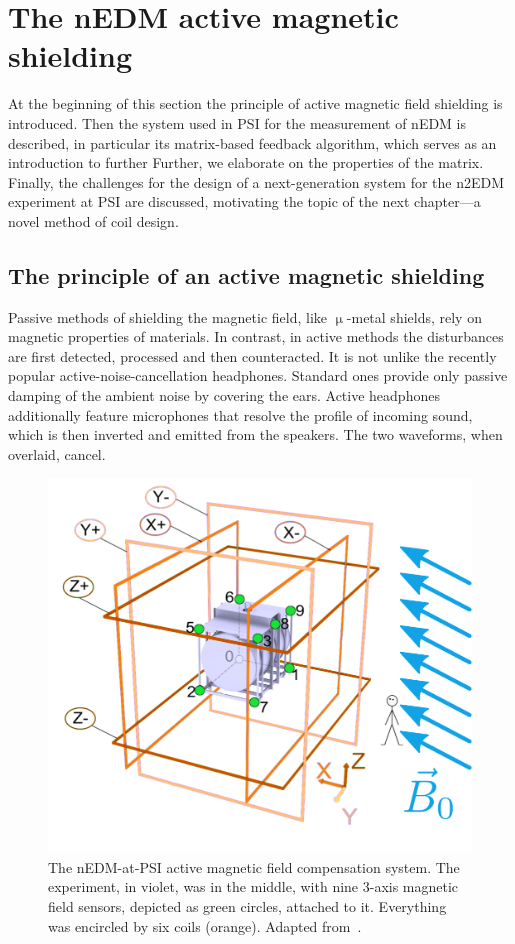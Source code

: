 \chapter{The nEDM active magnetic shielding}

\label{ch:nedm_sfc}

At the beginning of this section the principle of active magnetic field shielding is introduced. Then the system used in PSI for the measurement of nEDM is described, in particular its matrix-based feedback algorithm, which serves as an introduction to further Further, we elaborate on the properties of the matrix. Finally, the challenges for the design of a next-generation system for the n2EDM experiment at PSI are discussed, motivating the topic of the next chapter---a novel method of coil design.


\section{The principle of an active magnetic shielding}
Passive methods of shielding the magnetic field, like $\upmu$-metal shields, rely on magnetic properties of materials. In contrast, in active methods the disturbances are first detected, processed and then counteracted. It is not unlike the recently popular active-noise-cancellation headphones. Standard ones provide only passive damping of the ambient noise by covering the ears. Active headphones additionally feature microphones that resolve the profile of incoming sound, which is then inverted and emitted from the speakers. The two waveforms, when overlaid, cancel.

\begin{figure}
  \centering
  \includegraphics[width=0.7\linewidth]{gfx/nEDM_SFC/SFCplain.pdf}
  \caption{The nEDM-at-PSI active magnetic field compensation system. The experiment, in violet, was in the middle, with nine 3-axis magnetic field sensors, depicted as green circles, attached to it. Everything was encircled by six coils (orange). Adapted from~\cite{Franke2013}.}\label{fig:sfc-scheme}
\end{figure}

